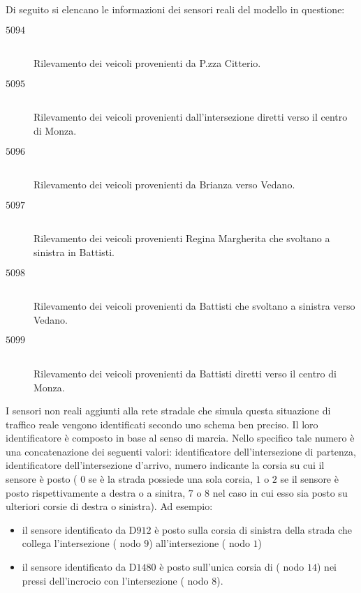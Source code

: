 Di seguito si elencano le informazioni dei sensori reali del modello in questione:
\begin{description}
\item[$5094$] \hfill \\
Rilevamento dei veicoli provenienti da P.zza Citterio.
\item[$5095$] \hfill \\
Rilevamento dei veicoli provenienti dall'intersezione  diretti verso il centro di Monza.
\item[$5096$] \hfill \\
Rilevamento dei veicoli provenienti da Brianza verso Vedano.
\item[$5097$] \hfill \\
Rilevamento dei veicoli provenienti Regina Margherita che svoltano a sinistra in Battisti.
\item[$5098$] \hfill \\
Rilevamento dei veicoli provenienti da Battisti che svoltano a sinistra verso Vedano.
\item[$5099$] \hfill \\
Rilevamento dei veicoli provenienti da Battisti diretti verso il centro di Monza.
\end{description}

I sensori non reali aggiunti alla rete stradale che simula questa situazione di traffico reale vengono identificati secondo uno schema ben preciso. Il loro identificatore è composto in base al senso di marcia. Nello specifico tale numero è una concatenazione dei seguenti valori: identificatore dell'intersezione di partenza, identificatore dell'intersezione d'arrivo, numero indicante la corsia su cui il sensore è posto (\ie{} $0$ se è la strada possiede una sola corsia, $1$ o $2$ se il sensore è posto rispettivamente a destra o a sinitra, $7$ o $8$ nel caso in cui esso sia posto su ulteriori corsie di destra o sinistra). Ad esempio:
\begin{itemize}
\item il sensore identificato da D$912$ è posto sulla corsia di sinistra della strada che collega l'intersezione  (\ie{} nodo $9$) all'intersezione  (\ie{} nodo $1$)
\item il sensore identificato da D$1480$ è posto sull'unica corsia di  (\ie{} nodo $14$) nei pressi dell'incrocio con l'intersezione  (\ie{} nodo $8$).
\end{itemize}


